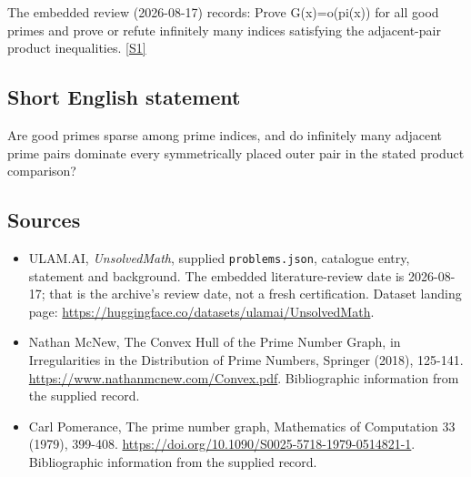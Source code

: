 \documentclass[11pt,a4paper]{article}
\newcommand{\sref}[2]{\hyperlink{source:#1:#2}{[S#2]}}
\begin{document}
The embedded review (2026-08-17) records: Prove G(x)=o(pi(x)) for all good primes and prove or refute infinitely many indices satisfying the adjacent-pair product inequalities. \sref{statement}{1}

\subsection{Short English statement}

Are good primes sparse among prime indices, and do infinitely many adjacent prime pairs dominate every symmetrically placed outer pair in the stated product comparison?

\subsection{Sources}

{\small

\begin{itemize}

\item[\hypertarget{source:statement:1}{S1}] ULAM.AI, \emph{UnsolvedMath}, supplied \texttt{problems.json}, catalogue entry, statement and background. The embedded literature-review date is 2026-08-17; that is the archive’s review date, not a fresh certification. Dataset landing page: \url{https://huggingface.co/datasets/ulamai/UnsolvedMath}.

\item[\hypertarget{source:statement:2}{S2}] Nathan McNew, The Convex Hull of the Prime Number Graph, in Irregularities in the Distribution of Prime Numbers, Springer (2018), 125-141. \url{https://www.nathanmcnew.com/Convex.pdf}. Bibliographic information from the supplied record.

\item[\hypertarget{source:statement:3}{S3}] Carl Pomerance, The prime number graph, Mathematics of Computation 33 (1979), 399-408. \url{https://doi.org/10.1090/S0025-5718-1979-0514821-1}. Bibliographic information from the supplied record.

\end{itemize}

}

\label{end:statement}
\end{document}
